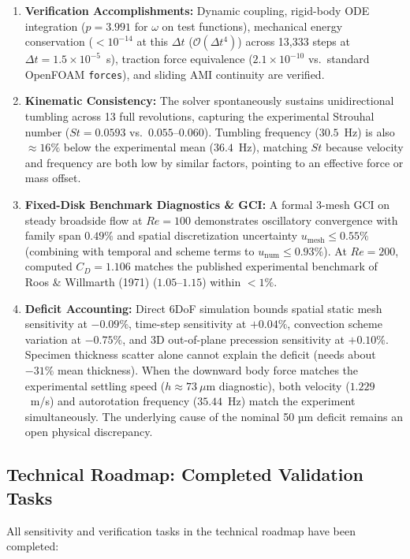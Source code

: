 \documentclass[11pt,a4paper]{article}
\begin{document}
\begin{enumerate}
    \item \textbf{Verification Accomplishments:} Dynamic coupling, rigid-body ODE integration ($p = 3.991$ for $\omega$ on test functions), mechanical energy conservation ($< 10^{-14}$ at this $\Delta t$ ($\mathcal{O}(\Delta t^4)$) across 13,333 steps at $\Delta t = 1.5 \times 10^{-5}$~s), traction force equivalence ($2.1 \times 10^{-10}$ vs.\ standard OpenFOAM \texttt{forces}), and sliding AMI continuity are verified.
    \item \textbf{Kinematic Consistency:} The solver spontaneously sustains unidirectional tumbling across 13 full revolutions, capturing the experimental Strouhal number ($St = 0.0593$ vs.\ $0.055$--$0.060$). Tumbling frequency ($30.5$~Hz) is also $\approx 16\%$ below the experimental mean ($36.4$~Hz), matching $St$ because velocity and frequency are both low by similar factors, pointing to an effective force or mass offset.
    \item \textbf{Fixed-Disk Benchmark Diagnostics \& GCI:} A formal 3-mesh GCI on steady broadside flow at $Re = 100$ demonstrates oscillatory convergence with family span $0.49\%$ and spatial discretization uncertainty $u_{\mathrm{mesh}} \le 0.55\%$ (combining with temporal and scheme terms to $u_{\mathrm{num}} \le 0.93\%$). At $Re = 200$, computed $C_D = 1.106$ matches the published experimental benchmark of Roos \& Willmarth (1971) ($1.05\text{--}1.15$) within $< 1\%$.
    \item \textbf{Deficit Accounting:} Direct 6DoF simulation bounds spatial static mesh sensitivity at $-0.09\%$, time-step sensitivity at $+0.04\%$, convection scheme variation at $-0.75\%$, and 3D out-of-plane precession sensitivity at $+0.10\%$. Specimen thickness scatter alone cannot explain the deficit (needs about $-31\%$ mean thickness). When the downward body force matches the experimental settling speed ($h \approx 73\ \mu$m diagnostic), both velocity ($1.229$~m/s) and autorotation frequency ($35.44$~Hz) match the experiment simultaneously. The underlying cause of the nominal 50 µm deficit remains an open physical discrepancy.
\end{enumerate}

\subsection{Technical Roadmap: Completed Validation Tasks}
All sensitivity and verification tasks in the technical roadmap have been completed:
\end{document}
